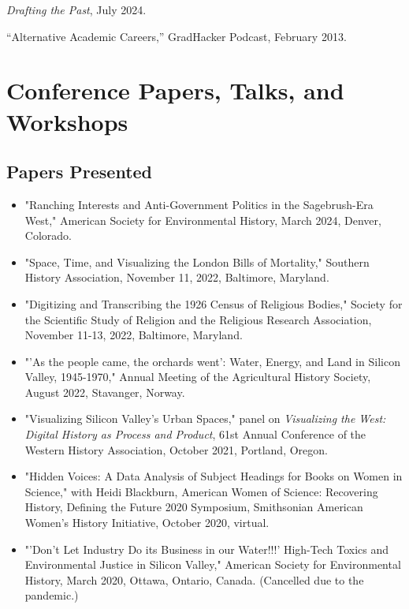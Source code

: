 \documentclass[10pt]{article}
\begin{document}
\textit{Drafting the Past}, July 2024.

``Alternative Academic Careers,'' GradHacker Podcast, February 2013.

\section*{Conference Papers, Talks, and Workshops}

\subsection*{Papers Presented}

\begin{itemize}
  \item "Ranching Interests and Anti-Government Politics in the Sagebrush-Era West," American Society for Environmental History, March 2024, Denver, Colorado.
  
  \item "Space, Time, and Visualizing the London Bills of Mortality," Southern History Association, November 11, 2022, Baltimore, Maryland.
  
  \item "Digitizing and Transcribing the 1926 Census of Religious Bodies," Society for the Scientific Study of Religion and the Religious Research Association, November 11-13, 2022, Baltimore, Maryland.
  
  \item "'As the people came, the orchards went': Water, Energy, and Land in Silicon Valley, 1945-1970," Annual Meeting of the Agricultural History Society, August 2022, Stavanger, Norway.
  
  \item "Visualizing Silicon Valley's Urban Spaces," panel on \textit{Visualizing the West: Digital History as Process and Product}, 61st Annual Conference of the Western History Association, October 2021, Portland, Oregon.
  
  \item "Hidden Voices: A Data Analysis of Subject Headings for Books on Women in Science," with Heidi Blackburn, American Women of Science: Recovering History, Defining the Future 2020 Symposium, Smithsonian American Women's History Initiative, October 2020, virtual.
  
  \item "'Don't Let Industry Do its Business in our Water!!!' High-Tech Toxics and Environmental Justice in Silicon Valley," American Society for Environmental History, March 2020, Ottawa, Ontario, Canada. (Cancelled due to the pandemic.)
  

\end{itemize}
\end{document}
